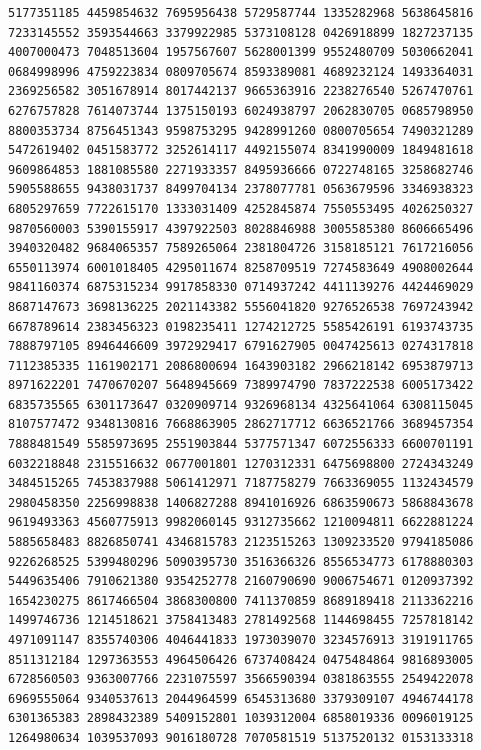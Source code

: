 \begin{Verbatim}[fontsize=\fontsize{6.4}{7.3}\selectfont]
5177351185 4459854632 7695956438 5729587744 1335282968 5638645816 7233145552 3593544663 3379922985 5373108128 0426918899 1827237135
4007000473 7048513604 1957567607 5628001399 9552480709 5030662041 0684998996 4759223834 0809705674 8593389081 4689232124 1493364031
2369256582 3051678914 8017442137 9665363916 2238276540 5267470761 6276757828 7614073744 1375150193 6024938797 2062830705 0685798950
8800353734 8756451343 9598753295 9428991260 0800705654 7490321289 5472619402 0451583772 3252614117 4492155074 8341990009 1849481618
9609864853 1881085580 2271933357 8495936666 0722748165 3258682746 5905588655 9438031737 8499704134 2378077781 0563679596 3346938323
6805297659 7722615170 1333031409 4252845874 7550553495 4026250327 9870560003 5390155917 4397922503 8028846988 3005585380 8606665496
3940320482 9684065357 7589265064 2381804726 3158185121 7617216056 6550113974 6001018405 4295011674 8258709519 7274583649 4908002644
9841160374 6875315234 9917858330 0714937242 4411139276 4424469029 8687147673 3698136225 2021143382 5556041820 9276526538 7697243942
6678789614 2383456323 0198235411 1274212725 5585426191 6193743735 7888797105 8946446609 3972929417 6791627905 0047425613 0274317818
7112385335 1161902171 2086800694 1643903182 2966218142 6953879713 8971622201 7470670207 5648945669 7389974790 7837222538 6005173422
6835735565 6301173647 0320909714 9326968134 4325641064 6308115045 8107577472 9348130816 7668863905 2862717712 6636521766 3689457354
7888481549 5585973695 2551903844 5377571347 6072556333 6600701191 6032218848 2315516632 0677001801 1270312331 6475698800 2724343249
3484515265 7453837988 5061412971 7187758279 7663369055 1132434579 2980458350 2256998838 1406827288 8941016926 6863590673 5868843678
9619493363 4560775913 9982060145 9312735662 1210094811 6622881224 5885658483 8826850741 4346815783 2123515263 1309233520 9794185086
9226268525 5399480296 5090395730 3516366326 8556534773 6178880303 5449635406 7910621380 9354252778 2160790690 9006754671 0120937392
1654230275 8617466504 3868300800 7411370859 8689189418 2113362216 1499746736 1214518621 3758413483 2781492568 1144698455 7257818142
4971091147 8355740306 4046441833 1973039070 3234576913 3191911765 8511312184 1297363553 4964506426 6737408424 0475484864 9816893005
6728560503 9363007766 2231075597 3566590394 0381863555 2549422078 6969555064 9340537613 2044964599 6545313680 3379309107 4946744178
6301365383 2898432389 5409152801 1039312004 6858019336 0096019125 1264980634 1039537093 9016180728 7070581519 5137520132 0153133318

\end{Verbatim}
